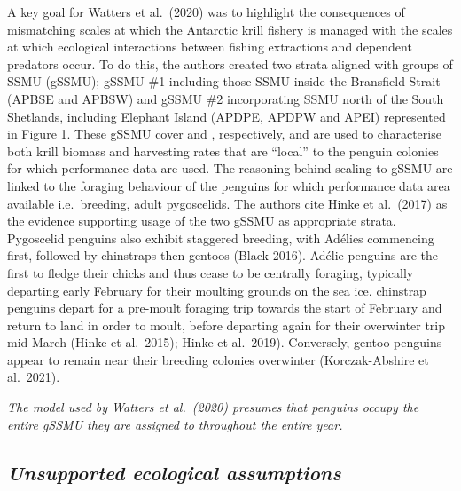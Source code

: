 \documentclass[]{elsarticle} %
\begin{document}
A key goal for Watters et al.~(2020) was to highlight the consequences
of mismatching scales at which the Antarctic krill fishery is managed
with the scales at which ecological interactions between fishing
extractions and dependent predators occur. To do this, the authors
created two strata aligned with groups of SSMU (gSSMU); gSSMU \#1
including those SSMU inside the Bransfield Strait (APBSE and APBSW) and
gSSMU \#2 incorporating SSMU north of the South Shetlands, including
Elephant Island (APDPE, APDPW and APEI) represented in Figure 1. These
gSSMU cover and , respectively, and are used to characterise both krill
biomass and harvesting rates that are ``local'' to the penguin colonies
for which performance data are used. The reasoning behind scaling to
gSSMU are linked to the foraging behaviour of the penguins for which
performance data area available i.e.~breeding, adult pygoscelids. The
authors cite Hinke et al.~(2017) as the evidence supporting usage of the
two gSSMU as appropriate strata. Pygoscelid penguins also exhibit
staggered breeding, with Adélies commencing first, followed by
chinstraps then gentoos (Black 2016). Adélie penguins are the first to
fledge their chicks and thus cease to be centrally foraging, typically
departing early February for their moulting grounds on the sea ice.
chinstrap penguins depart for a pre-moult foraging trip towards the
start of February and return to land in order to moult, before departing
again for their overwinter trip mid-March (Hinke et al.~2015); Hinke et
al.~2019). Conversely, gentoo penguins appear to remain near their
breeding colonies overwinter (Korczak-Abshire et al.~2021).

\emph{The model used by Watters et al.~(2020) presumes that penguins
occupy the entire gSSMU they are assigned to throughout the entire
year.}

\subsection{\texorpdfstring{\emph{Unsupported ecological
assumptions}}{Unsupported ecological assumptions}}\label{unsupported-ecological-assumptions}
\end{document}
